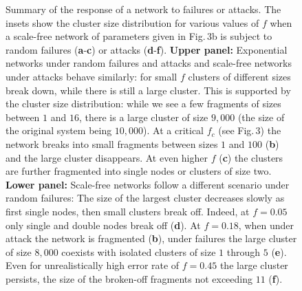 \newpage
\begin{figure}[ht]
\vspace{-2.5in}
\renewcommand\baselinestretch{0.90}
\caption{Summary of the response of a network to failures or attacks. The insets show the cluster size distribution for various values of $f$ when a scale-free network of parameters given in Fig.$\,$3b is subject to random failures ({\bf a}-{\bf c}) or attacks ({\bf d}-{\bf f}). {\bf Upper panel:} Exponential networks under random failures and attacks and scale-free networks under attacks behave similarly: for small $f$ clusters of different sizes break down, while there is still a large cluster. This is supported by the cluster size distribution: while we see a few fragments of sizes between $1$ and $16$, there is a large cluster of size $9,000$ (the size of the original system being $10,000$). At a critical $f_c$ (see Fig.$\,$3) the network breaks into small fragments between sizes $1$ and $100$ ({\bf b}) and the large cluster disappears. At even higher $f$ ({\bf c}) the clusters are further fragmented into single nodes or clusters of size two. {\bf Lower panel:} Scale-free networks follow a different scenario under random failures: The size of the largest cluster decreases slowly as first single nodes, then small clusters break off. Indeed, at $f=0.05$ only single and double nodes break off ({\bf d}). At $f=0.18$, when under attack the network is fragmented ({\bf b}), under failures the large cluster of size $8,000$ coexists with isolated clusters of size $1$ through $5$ ({\bf e}). Even for unrealistically high error rate of $f=0.45$ the large cluster persists, the size of the broken-off fragments not exceeding $11$ ({\bf f}).}
\end{figure} 







